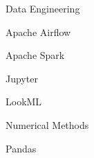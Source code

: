 \begin{skillset}{Data Engineering}
  \item Apache Airflow
  \item Apache Spark
  \item Jupyter
  \item LookML
  \item Numerical Methods
  \item Pandas
\end{skillset}
